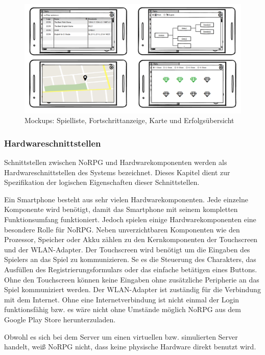 			\begin{figure}[htbp]
				\centering 
				\label{mockupFenster}
				\includegraphics[width=\textwidth]{pics/NewWindows.png}
				\caption{Mockups: Spielliste, Fortschrittanzeige, Karte und Erfolgsübersicht}
			\end{figure}
		
		\subsubsection{Hardwareschnittstellen}
			Schnittstellen zwischen NoRPG und Hardwarekomponenten werden als Hardwareschnittstellen des Systems bezeichnet. Dieses Kapitel dient zur Spezifikation der logischen Eigenschaften dieser Schnittstellen.
			
			Ein Smartphone besteht aus sehr vielen Hardwarekomponenten. Jede einzelne Komponente wird benötigt, damit das Smartphone mit seinem kompletten Funktionsumfang funktioniert. Jedoch spielen einige Hardwarekomponenten eine besondere Rolle für NoRPG. Neben unverzichtbaren Komponenten wie den Prozessor, Speicher oder Akku zählen zu den Kernkomponenten der Touchscreen und der WLAN-Adapter.	Der Touchscreen wird benötigt um die Eingaben des Spielers an das Spiel zu kommunizieren. Se es die Steuerung des Charakters, das Ausfüllen des Registrierungsformulars oder das einfache betätigen eines Buttons. Ohne den Touchscreen können keine Eingaben ohne zusätzliche Peripherie an das Spiel kommuniziert werden. Der WLAN-Adapter ist zuständig für die Verbindung mit dem Internet. Ohne eine Internetverbindung ist nicht einmal der Login funktionsfähig bzw. es wäre nicht ohne Umstände möglich NoRPG aus dem Google Play Store herunterzuladen.
			
			Obwohl es sich bei dem Server um einen virtuellen bzw. simulierten Server handelt, weiß NoRPG nicht, dass keine physische Hardware direkt benutzt wird. 
			

